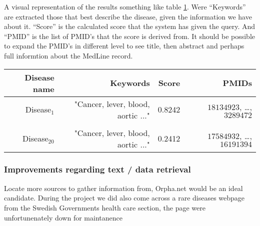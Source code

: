 A visual representation of the results something like table
\ref{FutureGUI}. Were ``Keywords'' are extracted those that best
describe the disease, given the information we have about
it. ``Score'' is the calculated score that the system has given the
query. And ``PMID'' is the list of PMID's that the score is derived
from. It should be possible to expand the PMID's in different level to
see title, then abstract and perhaps full informtion about the MedLine
record.
\begin{table}
  \begin{tabular}{|r|r|r|r|}
    \hline
    Disease name & Keywords & Score & PMIDs \\
    \hline
    Disease$_1$ & "Cancer, lever, blood, aortic ..." & 0.8242 & $18134923$, \dots, $3289472$ \\
    \hline
    {} & {} & {} & {} \\
    \hline
    Disease$_20$ & "Cancer, lever, blood, aortic ..." & 0.2412 & $17584932$, \dots, $16191394$ \\
    \hline
  \end{tabular}
  \label{FutureGUI}
\end{table}

\subsubsection{Improvements regarding text / data retrieval}
Locate more sources to gather information from, Orpha.net would be an ideal candidate. During the project we did also come across a rare diseases webpage from the Swedish Governments health care section, the page were unfortunenately down for maintanence

